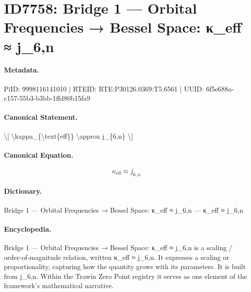\section*{ID7758: Bridge 1 — Orbital Frequencies → Bessel Space: κ\_eff ≈ j\_6,n}
\paragraph{Metadata.}
PiID: 9998116141010 | RTEID: RTE:P30126.0369:T5.6561 | UUID: 6f5e688a-c157-55b3-b3bb-1ffd80b15fa9

\paragraph{Canonical Statement.}
\textbackslash{}[ \textbackslash{}kappa\_\{\textbackslash{}text\{eff\}\} \textbackslash{}approx j\_\{6,n\} \textbackslash{}]

\paragraph{Canonical Equation.}
\[
\kappa_{\text{eff}} \approx j_{6,n}
\]

\paragraph{Dictionary.}
Bridge 1 — Orbital Frequencies → Bessel Space: κ\_eff ≈ j\_6,n — κ\_eff ≈ j\_6,n

\paragraph{Encyclopedia.}
Bridge 1 — Orbital Frequencies → Bessel Space: κ\_eff ≈ j\_6,n is a scaling / order-of-magnitude relation, written κ\_eff ≈ j\_6,n. It expresses a scaling or proportionality, capturing how the quantity grows with its parameters. It is built from j\_6,n. Within the Trawin Zero Point registry it serves as one element of the framework's mathematical narrative.
